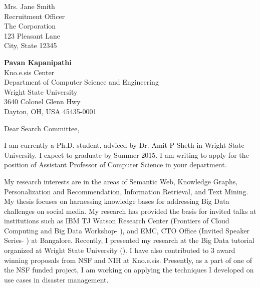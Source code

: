 \documentclass[10pt]{letter} %
\begin{document}

\begin{letter}{Mrs. Jane Smith \\
Recruitment Officer \\
The Corporation \\
123 Pleasant Lane \\
City, State 12345} 

{\large\bf Pavan Kapanipathi} \\ %
Kno.e.sis Center \\ Department of Computer Science and Engineering \\ Wright State University  \\ 3640 Colonel Glenn Hwy \\ Dayton, OH, USA 45435-0001 %



\opening{Dear Search Committee,} 

% 

I am currently a Ph.D. student, adviced by Dr. Amit P Sheth in Wright State University. I expect to graduate by Summer 2015. I am writing to apply for the position of Assistant Professor of Computer Science in your department. 

My research interests are in the areas of Semantic Web, Knowledge Graphs, Personalization and Recommendation, Information Retrieval, and Text Mining. My thesis focuses on harnessing knowledge bases for addressing Big Data challenges on social media. My research has provided the basis for invited talks at institutions such as IBM TJ Watson Research Center (Frontiers of Cloud Computing and Big Data Workshop- ), and EMC, CTO Office (Invited Speaker Series- ) at Bangalore. Recently, I presented my research at the Big Data tutorial organized at Wright State University (). I have also contributed to 3 award winning proposals from NSF and NIH at Kno.e.sis. Presently, as a part of one of the NSF funded project, I am working on applying the techniques I developed on use cases in disaster management. 


\end{letter}
\end{document}
